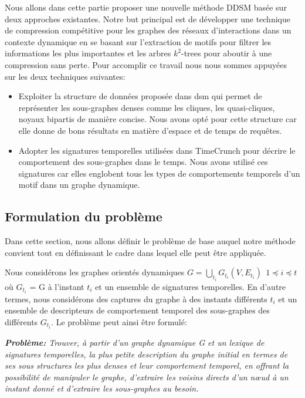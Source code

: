 Nous allons dans cette partie proposer une nouvelle méthode DDSM basée sur deux approches existantes. Notre but principal est de développer une technique de compression compétitive pour les graphes des réseaux d'interactions dans un contexte dynamique en se basant sur l'extraction de motifs pour filtrer les informations les plus importantes et les arbres $k^2$-trees pour aboutir à une compression sans perte. Pour accomplir ce travail nous nous sommes appuyées sur les deux techniques suivantes:
\begin{itemize}
\item Exploiter la structure de données proposée dans \gls{dsm} \citep{hernandez2014compressed} qui permet de représenter les sous-graphes denses comme les cliques, les quasi-cliques, noyaux bipartis de manière concise. Nous avons opté pour cette structure car  elle donne de bons résultats en matière d'espace et de temps de requêtes.  
\item Adopter les signatures temporelles utilisées dans TimeCrunch \citep{shah2015timecrunch} pour décrire le comportement des sous-graphes dans le temps. Nous avons utilisé ces signatures car elles englobent tous les types de comportements temporels d'un motif dans un graphe dynamique.
\end{itemize}	
		
		\subsection{Formulation du problème}
		Dans cette section, nous allons définir le problème de base auquel notre méthode convient tout en définissant le cadre dans lequel elle peut être appliquée. 
		
		Nous considérons les graphes orientés dynamiques $\displaystyle{G=\bigcup_{t_{i}}G_{t_{i}}(V,E_{t_{i}})}\ \ 1 \preceq i \preceq t$ où $G_{t_{i}}$ = G à l'instant $t_{i}$ et un ensemble de signatures temporelles. En d'autre termes, nous considérons des captures du graphe à des instants différents $t_{i}$ et un ensemble de descripteurs de comportement temporel des sous-graphes des différents $G_{t_{i}}$. Le problème peut ainsi être formulé:
		
			\textit{\textbf{Problème:}
		Trouver, à partir d'un graphe dynamique G et un lexique de signatures temporelles, la plus petite description du graphe initial en termes de ses sous structures les plus denses et leur comportement temporel, en offrant la possibilité de manipuler le graphe, d'extraire les voisins directs d'un nœud à un instant donné et d'extraire les sous-graphes au besoin. }

